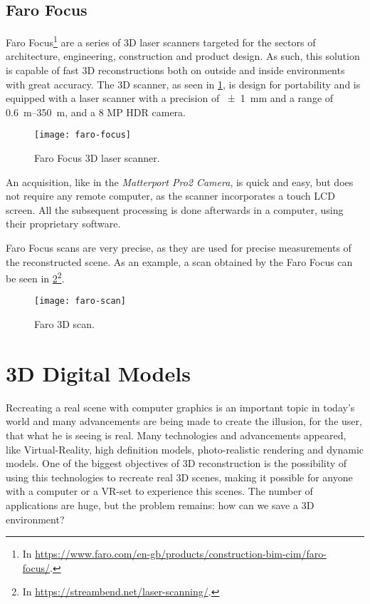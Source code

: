 \subsection{Faro Focus}

Faro Focus\footnote{In \url{https://www.faro.com/en-gb/products/construction-bim-cim/faro-focus/}.} are a series of 3D laser scanners targeted for the sectors of architecture, engineering, construction and product design. As such, this solution is capable of fast 3D reconstructions both on outside and inside environments with great accuracy. The 3D scanner, as seen in \cref{fig:faro-focus}, is design for portability and is equipped with a laser scanner with a precision of \SI{+-1}{\milli\meter} and a range of \SIrange{0.6}{350}{\meter}, and a 8 MP HDR camera.

\begin{figure}[h]
    \centering
    \texttt{[image: faro-focus]}
    \caption{Faro Focus 3D laser scanner.}
    \label{fig:faro-focus}
\end{figure}

An acquisition, like in the \emph{Matterport Pro2 Camera}, is quick and easy, but does not require any remote computer, as the scanner incorporates a touch LCD screen. All the subsequent processing is done afterwards in a computer, using their proprietary software.

Faro Focus scans are very precise, as they are used for precise measurements of the reconstructed scene. As an example, a scan obtained by the Faro Focus can be seen in \cref{fig:faro-scan}\footnote{In \url{https://streambend.net/laser-scanning/}.}.

\begin{figure}[h]
    \centering
    \texttt{[image: faro-scan]}
    \caption{Faro 3D scan.}
    \label{fig:faro-scan}
    
\end{figure}

\section{3D Digital Models}

Recreating a real scene with computer graphics is an important topic in today's world and many advancements are being made to create the illusion, for the user, that what he is seeing is real. Many technologies and advancements appeared, like Virtual-Reality, high definition models, photo-realistic rendering and dynamic models. One of the biggest objectives of 3D reconstruction is the possibility of using this technologies to recreate real 3D scenes, making it possible for anyone with a computer or a VR-set to experience this scenes. The number of applications are huge, but the problem remains: how can we save a 3D environment?

